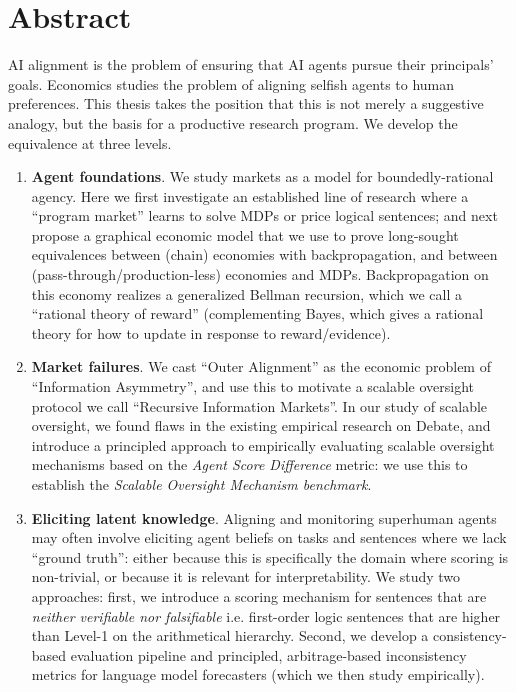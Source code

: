 \chapter{Abstract}

AI alignment is the problem of ensuring that AI agents pursue their principals' goals. Economics studies the problem of aligning selfish agents to human preferences. This thesis takes the position that this is not merely a suggestive analogy, but the basis for a productive research program. We develop the equivalence at three levels. 
\begin{enumerate}
\item \textbf{Agent foundations}. We study markets as a model for boundedly-rational agency. Here we first investigate an established line of research where a ``program market'' learns to solve MDPs or price logical sentences; and next propose a graphical economic model that we use to prove long-sought equivalences between (chain) economies with backpropagation, and between (pass-through/production-less) economies and MDPs. Backpropagation on this economy realizes a generalized Bellman recursion, which we call a ``rational theory of reward'' (complementing Bayes, which gives a rational theory for how to update in response to reward/evidence).
\item \textbf{Market failures}. We cast ``Outer Alignment'' as the economic problem of ``Information Asymmetry'', and use this to motivate a scalable oversight protocol we call ``Recursive Information Markets''. In our study of scalable oversight, we found flaws in the existing empirical research on Debate, and introduce a principled approach to empirically evaluating scalable oversight mechanisms based on the \emph{Agent Score Difference} metric: we use this to establish the \emph{Scalable Oversight Mechanism benchmark}.
\item \textbf{Eliciting latent knowledge}. Aligning and monitoring superhuman agents may often involve eliciting agent beliefs on tasks and sentences where we lack ``ground truth'': either because this is specifically the domain where scoring is non-trivial, or because it is relevant for interpretability. We study two approaches: first, we introduce a scoring mechanism for sentences that are \emph{neither verifiable nor falsifiable} i.e. first-order logic sentences that are higher than Level-1 on the arithmetical hierarchy. Second, we develop a consistency-based evaluation pipeline and principled, arbitrage-based inconsistency metrics for language model forecasters (which we then study empirically).
\end{enumerate}
